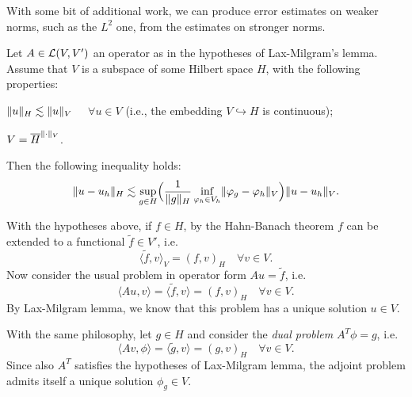 With some bit of additional work, we can produce error estimates on weaker norms, such as the $L^2$ one, from the estimates on stronger norms.
\begin{lemma}[Nitsche] \label{lemma:nitsche}
Let $A \in \mathcal{L}(V,V')$ an operator as in the hypotheses of Lax-Milgram's lemma. Assume that $V$ is a subspace of some Hilbert space $H$, with the following properties:
\begin{romanlist}
\item $\lVert u\rVert_H \lesssim \lVert u\rVert_V$ $\quad \forall u \in V$ \quad (i.e., the embedding $V \hookrightarrow H$ is continuous);
\item $V = \overline{H}^{\lVert\cdot\rVert_V}$.
\end{romanlist}
Then the following inequality holds:
\begin{equation}\label{eqn:nitsche_lemma}
\lVert u-u_h\rVert_H \lesssim \sup_{g \in H} \Bigl( \frac{1}{\lVert g\rVert_H} \inf_{\varphi_h \in V_h} \lVert\varphi_g - \varphi_h\rVert_V \Bigr) \lVert u-u_h\rVert_V .
\end{equation}
\end{lemma}

\begin{remark}
With the hypotheses above, if $f \in H$, by the Hahn-Banach theorem $f$ can be extended to a functional $\tilde{f} \in V'$, i.e.
\[
\langle \tilde{f}, v \rangle_V = (f, v)_H \quad \forall v \in V.
\]
Now consider the usual problem in operator form $A u = \tilde{f}$, i.e.
\begin{equation}
\langle Au,v \rangle = \langle \tilde{f},v \rangle = (f, v)_H \quad \forall v\in V.
\end{equation}
By Lax-Milgram lemma, we know that this problem has a unique solution $u \in V$.

With the same philosophy, let $g \in H$ and consider the \emph{dual problem} $A^T \phi = g$, i.e.
\begin{equation}
\langle Av,\phi \rangle = \langle \tilde{g},v \rangle = (g, v)_H \quad \forall v\in V.
\end{equation}
Since also $A^T$ satisfies the hypotheses of  Lax-Milgram lemma, the adjoint problem admits itself a unique solution $\phi_g \in V$.
\end{remark}

